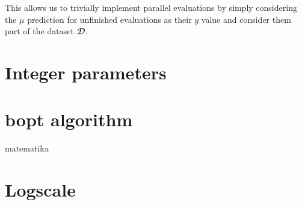 This allows us to trivially implement parallel evaluations by simply
considering the $μ$ prediction for unfinished evaluations as their $y$ value
and consider them part of the dataset $𝓓$.


\section{Integer parameters}



\section{bopt algorithm}

matematika

\section{Logscale}

